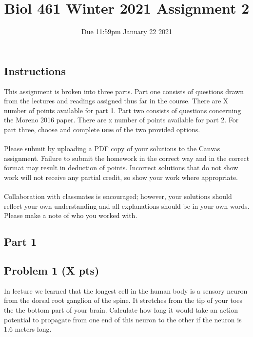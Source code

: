 \documentclass{article}
\title{Biol 461 Winter 2021 Assignment 2}
\author{Due 11:59pm January 22 2021}
\date{}
\begin{document}
\maketitle

\subsection*{Instructions}
This assignment is broken into three parts. Part one consists of questions drawn from the lectures and readings assigned thus far in the course. There are X number of points available for part 1. Part two consists of questions concerning the Moreno 2016 paper. There are x number of points available for part 2. For part three, choose and complete \textbf{one} of the two provided options.\\\\
Please submit by uploading a PDF copy of your solutions to the Canvas assignment. Failure to submit the homework in the correct way and in the correct format may result in deduction of points. Incorrect solutions that do not show work will not receive any partial credit, so show your work where appropriate. \\\\
Collaboration with classmates is encouraged; however, your solutions should reflect your own understanding and all explanations should be in your own words. Please make a note of who you worked with.

\subsection*{Part 1}

\subsection*{Problem 1 (X pts)}
In lecture we learned that the longest cell in the human body is a sensory neuron from the dorsal root ganglion of the spine. It stretches from the tip of your toes the the bottom part of your brain. Calculate how long it would take an action potential to propagate from one end of this neuron to the other if the neuron is 1.6 meters long.

\pagebreak{}
\end{document}

